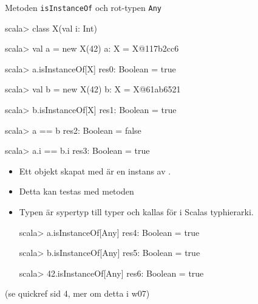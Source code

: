 \begin{Slide}{Metoden \texttt{isInstanceOf} och rot-typen \texttt{Any}}
\SlideFontSmall
\begin{multicols}{2}


\begin{REPL}
scala> class X(val i: Int) 

scala> val a = new X(42)
a: X = X@117b2cc6

scala> a.isInstanceOf[X]
res0: Boolean = true

scala> val b = new X(42)
b: X = X@61ab6521

scala> b.isInstanceOf[X]
res1: Boolean = true

scala> a == b
res2: Boolean = false

scala> a.i == b.i
res3: Boolean = true

\end{REPL}

\columnbreak

\begin{itemize}

\item Ett objekt skapat med  är en instans av  . 

\item Detta kan testas med metoden 

\pause

\item Typen  är sypertyp till  typer och kallas för  i Scalas  typhierarki. 

\begin{REPL}
scala> a.isInstanceOf[Any]
res4: Boolean = true

scala> b.isInstanceOf[Any]
res5: Boolean = true

scala> 42.isInstanceOf[Any]
res6: Boolean = true

\end{REPL}

\end{itemize}
{\SlideFontTiny \hfill(se quickref sid 4, mer om detta i w07)}
\end{multicols}
\end{Slide}



